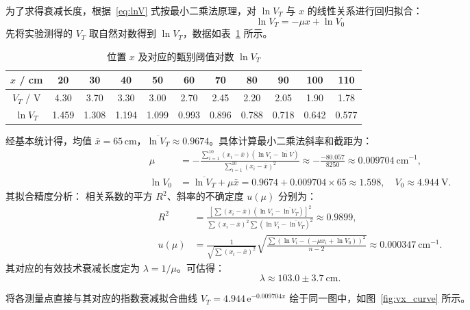 \documentclass[12pt,a4paper]{article}
\begin{document}
为了求得衰减长度，根据~\eqref{eq:lnV} 式按最小二乘法原理，对 $\ln V_T$ 与 $x$ 的线性关系进行回归拟合：
\begin{equation}
    \ln V_T = -\mu x + \ln V_0
\end{equation}
先将实验测得的 $V_T$ 取自然对数得到 $\ln V_T$，数据如表~\ref{tab:lnv} 所示。

\begin{table}[htbp]
\centering
\caption{位置 $x$ 及对应的甄别阈值对数 $\ln V_T$}
\label{tab:lnv}
\begin{tabular}{ccccccccccc}
\toprule
$x$ / \unit{\centi\meter} & 20 & 30 & 40 & 50 & 60 & 70 & 80 & 90 & 100 & 110 \\
\midrule
$V_T$ / \unit{\volt} & 4.30 & 3.70 & 3.30 & 3.00 & 2.70 & 2.45 & 2.20 & 2.05 & 1.90 & 1.78 \\
$\ln V_T$ & 1.459 & 1.308 & 1.194 & 1.099 & 0.993 & 0.896 & 0.788 & 0.718 & 0.642 & 0.577 \\
\bottomrule
\end{tabular}
\end{table}

经基本统计得，均值 $\bar{x} = 65\,\unit{\centi\meter}$，$\overline{\ln V_T} \approx 0.9674$。具体计算最小二乘法斜率和截距为：
\begin{align*}
    \mu &= -\frac{\sum_{i=1}^{10} (x_i - \bar{x})(\ln V_i - \overline{\ln V})}{\sum_{i=1}^{10} (x_i - \bar{x})^2} \approx -\frac{-80.057}{8250} \approx 0.009704 \ \unit{\centi\meter^{-1}}, \\
    \ln V_0 &= \overline{\ln V_T} + \mu \bar{x} = 0.9674 + 0.009704 \times 65 \approx 1.598, \quad V_0 \approx \SI{4.944}{\volt}.
\end{align*}
其拟合精度分析：
相关系数的平方 $R^2$、斜率的不确定度 $u(\mu)$ 分别为：
\begin{align*}
    R^2 &= \frac{[\sum (x_i - \bar{x})(\ln V_i - \overline{\ln V_T})]^2}{\sum (x_i - \bar{x})^2 \sum (\ln V_i - \overline{\ln V_T})^2} \approx 0.9899, \\
    u(\mu) &= \frac{1}{\sqrt{\sum (x_i - \bar{x})^2}} \sqrt{\frac{\sum (\ln V_i - (-\mu x_i + \ln V_0))^2}{n - 2}} \approx 0.000347 \ \unit{\centi\meter^{-1}}.
\end{align*}
其对应的有效技术衰减长度定为 $\lambda = 1/\mu$。可估得：
\begin{equation}
    \lambda \approx 103.0 \pm 3.7 \ \unit{\centi\meter}.
\end{equation}

将各测量点直接与其对应的指数衰减拟合曲线 $V_T = 4.944\,\mathrm{e}^{-0.009704 x}$ 绘于同一图中，如图~\ref{fig:vx_curve} 所示。
\end{document}
